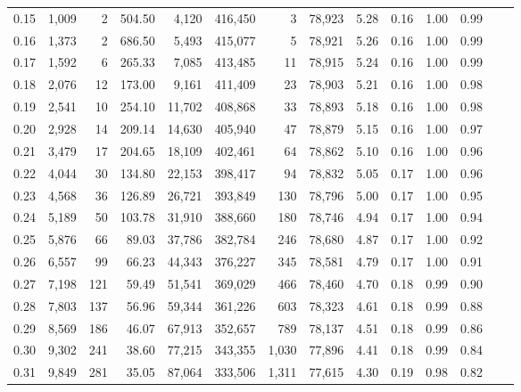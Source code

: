 \begin{tabular}{rrrrrrrrrrrrrr}
0.15 &   1,009 &      2 &  504.50 &    4,120 &  416,450 &       3 &  78,923 &  5.28 &  0.16 &  1.00 &      0.99 \\
0.16 &   1,373 &      2 &  686.50 &    5,493 &  415,077 &       5 &  78,921 &  5.26 &  0.16 &  1.00 &      0.99 \\
0.17 &   1,592 &      6 &  265.33 &    7,085 &  413,485 &      11 &  78,915 &  5.24 &  0.16 &  1.00 &      0.99 \\
0.18 &   2,076 &     12 &  173.00 &    9,161 &  411,409 &      23 &  78,903 &  5.21 &  0.16 &  1.00 &      0.98 \\
0.19 &   2,541 &     10 &  254.10 &   11,702 &  408,868 &      33 &  78,893 &  5.18 &  0.16 &  1.00 &      0.98 \\
0.20 &   2,928 &     14 &  209.14 &   14,630 &  405,940 &      47 &  78,879 &  5.15 &  0.16 &  1.00 &      0.97 \\
0.21 &   3,479 &     17 &  204.65 &   18,109 &  402,461 &      64 &  78,862 &  5.10 &  0.16 &  1.00 &      0.96 \\
0.22 &   4,044 &     30 &  134.80 &   22,153 &  398,417 &      94 &  78,832 &  5.05 &  0.17 &  1.00 &      0.96 \\
0.23 &   4,568 &     36 &  126.89 &   26,721 &  393,849 &     130 &  78,796 &  5.00 &  0.17 &  1.00 &      0.95 \\
0.24 &   5,189 &     50 &  103.78 &   31,910 &  388,660 &     180 &  78,746 &  4.94 &  0.17 &  1.00 &      0.94 \\
0.25 &   5,876 &     66 &   89.03 &   37,786 &  382,784 &     246 &  78,680 &  4.87 &  0.17 &  1.00 &      0.92 \\
0.26 &   6,557 &     99 &   66.23 &   44,343 &  376,227 &     345 &  78,581 &  4.79 &  0.17 &  1.00 &      0.91 \\
0.27 &   7,198 &    121 &   59.49 &   51,541 &  369,029 &     466 &  78,460 &  4.70 &  0.18 &  0.99 &      0.90 \\
0.28 &   7,803 &    137 &   56.96 &   59,344 &  361,226 &     603 &  78,323 &  4.61 &  0.18 &  0.99 &      0.88 \\
0.29 &   8,569 &    186 &   46.07 &   67,913 &  352,657 &     789 &  78,137 &  4.51 &  0.18 &  0.99 &      0.86 \\
0.30 &   9,302 &    241 &   38.60 &   77,215 &  343,355 &   1,030 &  77,896 &  4.41 &  0.18 &  0.99 &      0.84 \\
0.31 &   9,849 &    281 &   35.05 &   87,064 &  333,506 &   1,311 &  77,615 &  4.30 &  0.19 &  0.98 &      0.82 \\

\end{tabular}
